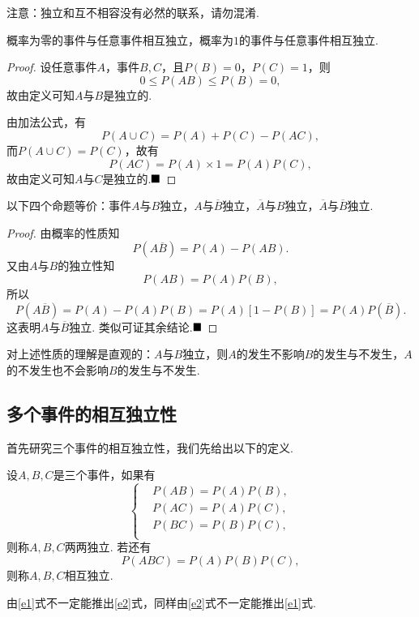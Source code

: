 注意：独立和互不相容没有必然的联系，请勿混淆.

\begin{theorem}
	概率为零的事件与任意事件相互独立，概率为$1$的事件与任意事件相互独立.
\end{theorem}
\begin{proof}
	设任意事件$A$，事件$B,C$，且$P(B)=0$，$P(C)=1$，则
	$$0\leqslant P(AB)\leqslant P(B)=0,$$
	故由定义可知$A$与$B$是独立的.
	
	由加法公式，有
	$$P(A\cup C)=P(A)+P(C)-P(AC),$$
	而$P(A\cup C)=P(C)$，故有
	$$P(AC)=P(A)\times 1=P(A)P(C),$$
	故由定义可知$A$与$C$是独立的.$\hfill\blacksquare$
	
\end{proof}


\begin{theorem}
	以下四个命题等价：事件$A$与$B$独立，$A$与$\overline{B}$独立，$\overline{A}$与$B$独立，$\overline{A}$与$\overline{B}$独立.
\end{theorem}
\begin{proof}
	由概率的性质知
	$$P(A\overline{B})=P(A)-P(AB).$$
	又由$A$与$B$的独立性知
	$$P(AB)=P(A)P(B),$$
	所以
	$$P(A\overline{B})=P(A)-P(A)P(B)=P(A)\left[1-P(B)\right]=P(A)P(\overline{B}).$$
	这表明$A$与$\overline{B}$独立. 类似可证其余结论.$\hfill\blacksquare$
\end{proof}
\begin{remark}
	对上述性质的理解是直观的：$A$与$B$独立，则$A$的发生不影响$B$的发生与不发生，$A$的不发生也不会影响$B$的发生与不发生.
\end{remark}
\subsection{多个事件的相互独立性}
首先研究三个事件的相互独立性，我们先给出以下的定义.
\begin{definition}
	设$A,B,C$是三个事件，如果有
	\begin{equation}\label{e1}
		\left\{
		\begin{aligned}
			&P(AB)=P(A)P(B),\\
			&P(AC)=P(A)P(C),\\
			&P(BC)=P(B)P(C),\\
		\end{aligned}
		\right.
	\end{equation}
	则称$A,B,C${\heiti 两两独立}. 若还有
	\begin{equation}\label{e2}
		P(ABC)=P(A)P(B)P(C),
	\end{equation}
	则称$A,B,C${\heiti 相互独立}.
\end{definition}
\begin{remark}
	由\ref{e1}式不一定能推出\ref{e2}式，同样由\ref{e2}式不一定能推出\ref{e1}式.
\end{remark}

